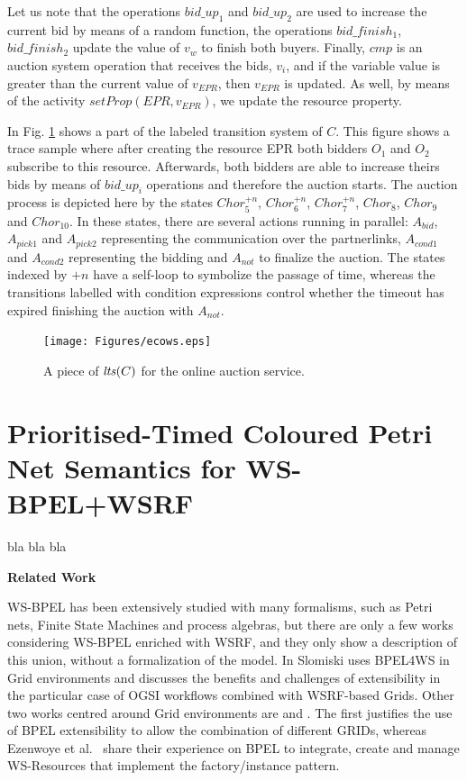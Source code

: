 \normalsize
\vspace{-0.7cm}

Let us note that the operations $bid\_up_{1}$ and $bid\_up_{2}$ are used to increase the current bid by means of a random function, the operations $bid\_finish_{1}$, $bid\_finish_{2}$ update the value of $v_w$ to finish both buyers. Finally, $cmp$ is an auction system operation that receives the bids, $v_i$, and if the variable value is greater than the current value of $v_{EPR}$, then $v_{EPR}$ is updated. As well, by means of the activity $setProp(EPR,v_{EPR})$, we update the resource property.

In Fig. \ref{auct} shows a part of the labeled transition system of $C$. This figure shows a trace sample where after creating the resource EPR both bidders $O_1$ and $O_2$ subscribe to this resource. Afterwards, both bidders are able to increase theirs bids by means of $bid\_up_i$ operations and therefore the auction starts. The auction process is depicted here by the states $Chor_{5}^{+n}$, $Chor_{6}^{+n}$, $Chor_{7}^{+n}$, $Chor_{8}$, $Chor_{9}$ and $Chor_{10}$. In these states, there are several actions running in parallel: $A_{bid}$, $A_{pick1}$ and $A_{pick2}$ representing the communication over the partnerlinks, $A_{cond1}$ and $A_{cond2}$ representing the bidding and $A_{not}$ to finalize the auction. The states indexed by $+n$ have a self-loop to symbolize the passage of time, whereas the transitions labelled with condition expressions control whether the timeout has expired finishing the auction with $A_{not}$.

\begin{figure}
\begin{center}
    \texttt{[image: Figures/ecows.eps]}
  \caption{A piece of ${\it lts}(C)$ for the online auction service.}
  \label{auct}
\end{center}
\end{figure}

\section{Prioritised-Timed Coloured Petri Net Semantics for WS-BPEL+WSRF}\label{semantics}

bla bla bla

{\bf Related Work}

WS-BPEL has been extensively studied with many formalisms, such as
Petri nets, Finite State Machines and process algebras, but 
there are only a few works considering WS-BPEL enriched with 
WSRF, and they only show a description of this union, 
without a formalization of the model.
In \cite{Slomiski:2006} Slomiski uses BPEL4WS in Grid environments and discusses the
benefits and challenges of extensibility in the particular case of OGSI workflows
combined with WSRF-based Grids. Other two works centred around Grid environments are 
\cite{Leymann:2006} and \cite{Ezenwoye:2007}. The first justifies 
the use of BPEL extensibility to allow the combination of different GRIDs, whereas
Ezenwoye et al.~\cite{Ezenwoye:2007} share their experience on BPEL to integrate,
create and manage WS-Resources that implement the factory/instance pattern.

